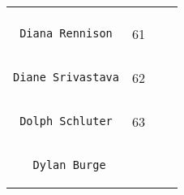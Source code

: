 \documentclass[]{article}
\begin{document}
\begin{longtable}[c]{@{}llll@{}}
\begin{minipage}[t]{0.15\columnwidth}
\end{minipage}
\\\noalign{\medskip}
\begin{minipage}[t]{0.39\columnwidth}\raggedright
\begin{verbatim}
 Diana Rennison
\end{verbatim}
\end{minipage} & \begin{minipage}[t]{0.10\columnwidth}\raggedright
61
\end{minipage} & \begin{minipage}[t]{0.13\columnwidth}\raggedright
\end{minipage} & \begin{minipage}[t]{0.15\columnwidth}\raggedright
\end{minipage}
\\\noalign{\medskip}
\begin{minipage}[t]{0.39\columnwidth}\raggedright
\begin{verbatim}
Diane Srivastava
\end{verbatim}
\end{minipage} & \begin{minipage}[t]{0.10\columnwidth}\raggedright
62
\end{minipage} & \begin{minipage}[t]{0.13\columnwidth}\raggedright
\end{minipage} & \begin{minipage}[t]{0.15\columnwidth}\raggedright
\end{minipage}
\\\noalign{\medskip}
\begin{minipage}[t]{0.39\columnwidth}\raggedright
\begin{verbatim}
 Dolph Schluter
\end{verbatim}
\end{minipage} & \begin{minipage}[t]{0.10\columnwidth}\raggedright
63
\end{minipage} & \begin{minipage}[t]{0.13\columnwidth}\raggedright
\end{minipage} & \begin{minipage}[t]{0.15\columnwidth}\raggedright
\end{minipage}
\\\noalign{\medskip}
\begin{minipage}[t]{0.39\columnwidth}\raggedright
\begin{verbatim}
   Dylan Burge

\end{verbatim}
\end{minipage}
\end{longtable}
\end{document}
